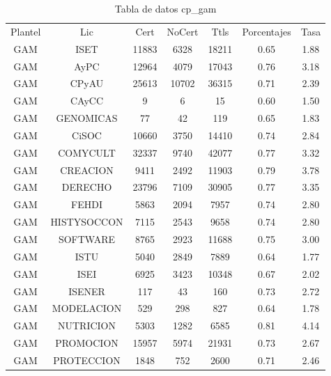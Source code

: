 \documentclass{article}
\begin{document}
\begin{table}[h]
\centering
\begin{tabular}{ccccccc}

Plantel & Lic & Cert & NoCert & Ttls & Porcentajes & Tasa \\

GAM & ISET & 11883 & 6328 & 18211 & 0.65 & 1.88 \\
GAM & AyPC & 12964 & 4079 & 17043 & 0.76 & 3.18 \\
GAM & CPyAU & 25613 & 10702 & 36315 & 0.71 & 2.39 \\
GAM & CAyCC & 9 & 6 & 15 & 0.60 & 1.50 \\
GAM & GENOMICAS & 77 & 42 & 119 & 0.65 & 1.83 \\
GAM & CiSOC & 10660 & 3750 & 14410 & 0.74 & 2.84 \\
GAM & COMYCULT & 32337 & 9740 & 42077 & 0.77 & 3.32 \\
GAM & CREACION & 9411 & 2492 & 11903 & 0.79 & 3.78 \\
GAM & DERECHO & 23796 & 7109 & 30905 & 0.77 & 3.35 \\
GAM & FEHDI & 5863 & 2094 & 7957 & 0.74 & 2.80 \\
GAM & HISTYSOCCON & 7115 & 2543 & 9658 & 0.74 & 2.80 \\
GAM & SOFTWARE & 8765 & 2923 & 11688 & 0.75 & 3.00 \\
GAM & ISTU & 5040 & 2849 & 7889 & 0.64 & 1.77 \\
GAM & ISEI & 6925 & 3423 & 10348 & 0.67 & 2.02 \\
GAM & ISENER & 117 & 43 & 160 & 0.73 & 2.72 \\
GAM & MODELACION & 529 & 298 & 827 & 0.64 & 1.78 \\
GAM & NUTRICION & 5303 & 1282 & 6585 & 0.81 & 4.14 \\
GAM & PROMOCION & 15957 & 5974 & 21931 & 0.73 & 2.67 \\
GAM & PROTECCION & 1848 & 752 & 2600 & 0.71 & 2.46 \\

\end{tabular}
\caption{Tabla de datos cp\_gam}
\end{table}
\end{document}
